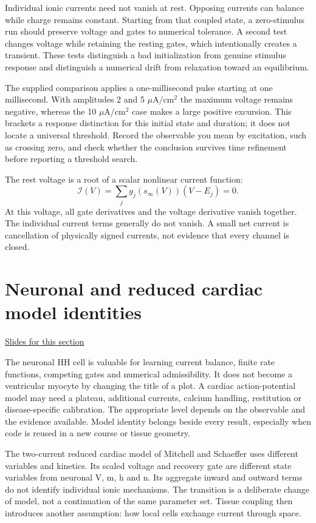 \documentclass[11pt,letterpaper]{article}
\theoremstyle{definition}\newtheorem{definition}{Definition}\newtheorem{example}{Example}
\numberwithin{equation}{section}
\begin{document}
Individual ionic currents need not vanish at rest. Opposing currents can balance while charge remains constant. Starting from that coupled state, a zero-stimulus run should preserve voltage and gates to numerical tolerance. A second test changes voltage while retaining the resting gates, which intentionally creates a transient. These tests distinguish a bad initialization from genuine stimulus response and distinguish a numerical drift from relaxation toward an equilibrium.

The supplied comparison applies a one-millisecond pulse starting at one millisecond. With amplitudes 2 and 5 \ensuremath{\mu}A/cm\ensuremath{^{2}} the maximum voltage remains negative, whereas the 10 \ensuremath{\mu}A/cm\ensuremath{^{2}} case makes a large positive excursion. This brackets a response distinction for this initial state and duration; it does not locate a universal threshold. Record the observable you mean by excitation, such as crossing zero, and check whether the conclusion survives time refinement before reporting a threshold search.

The rest voltage is a root of a scalar nonlinear current function:
\[
 \mathcal I(V)=\sum_jg_j(s_\infty(V))(V-E_j)=0.
\]
At this voltage, all gate derivatives and the voltage derivative vanish together. The individual current terms generally do not vanish. A small net current is cancellation of physically signed currents, not evidence that every channel is closed.
\section{Neuronal and reduced cardiac model identities}
\hypertarget{note-neuronal-and-reduced-cardiac-model-identities}{}\label{note:neuronal-and-reduced-cardiac-model-identities}
{\small \href{slides.html\#frame=model-identity\&step=1}{Slides for this section}}\par
The neuronal HH cell is valuable for learning current balance, finite rate functions, competing gates and numerical admissibility. It does not become a ventricular myocyte by changing the title of a plot. A cardiac action-potential model may need a plateau, additional currents, calcium handling, restitution or disease-specific calibration. The appropriate level depends on the observable and the evidence available. Model identity belongs beside every result, especially when code is reused in a new course or tissue geometry.

The two-current reduced cardiac model of Mitchell and Schaeffer uses different variables and kinetics. Its scaled voltage and recovery gate are different state variables from neuronal V, m, h and n. Its aggregate inward and outward terms do not identify individual ionic mechanisms. The transition is a deliberate change of model, not a continuation of the same parameter set. Tissue coupling then introduces another assumption: how local cells exchange current through space.
\end{document}
